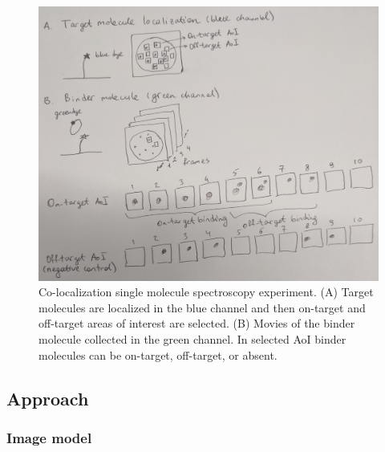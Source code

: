 \begin{figure}
\includegraphics[width=\linewidth]{figures/figure1.jpg}
\caption{Co-localization single molecule spectroscopy experiment. (A) Target molecules are localized in the blue channel and then on-target and off-target areas of interest are selected. (B) Movies of the binder molecule collected in the green channel. In selected AoI binder molecules can be on-target, off-target, or absent.}
\label{fig:cosmos_experiment}
\end{figure}

\subsection{Approach}

\subsubsection{Image model}

